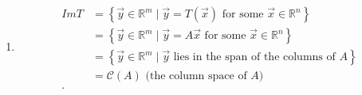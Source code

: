 \documentclass{report}
\begin{document}
{\begin{enumerate}[label=(\roman*)]
	     
     \item 
	     \begin{align*}
	     	Im T & = \left\{ \vec{ y}  \in \mathbb{R} ^{ m} \mid \vec{ y} = T \left( \vec{ x}  \right) \text{ for some } \vec{ x}  \in \mathbb{R} ^n \right\}  \\
			     	& = \left\{ \vec{ y}  \in \mathbb{R} ^{ m} \mid \vec{ y} = A\vec{x}  \text{ for some } \vec{ x}  \in \mathbb{R} ^n \right\}  \\
							     	& = \left\{ \vec{ y}  \in \mathbb{R} ^{ m} \mid  \vec{ y} \text{ lies in the span of the columns of } A \right\}  \\
								& = \mathcal{C} \left( A \right) \text{ (the column space of } A \text{) }\\
	     .\end{align*}
     \end{enumerate}
     
     
     }
     
   
       
\end{document}
